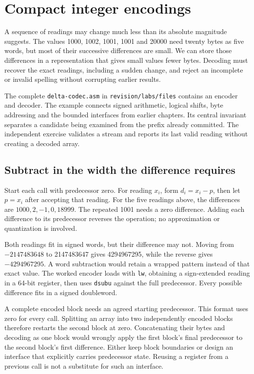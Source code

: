 \chapter{Compact integer encodings}
\label{revision:encodings}

A sequence of readings may change much less than its absolute magnitude suggests.
The values 1000, 1002, 1001, 1001 and 20000 need twenty bytes as five words, but
most of their successive differences are small. We can store those differences
in a representation that gives small values fewer bytes. Decoding must recover
the exact readings, including a sudden change, and reject an incomplete or
invalid spelling without corrupting earlier results.

The complete \texttt{delta-codec.asm} in \texttt{revision/labs/files} contains
an encoder and decoder. The example connects signed arithmetic, logical shifts,
byte addressing and the bounded interfaces from earlier chapters. Its central
invariant separates a candidate being examined from the prefix already committed.
The independent exercise validates a stream and reports its last valid reading
without creating a decoded array.

\section{Subtract in the width the difference requires}

Start each call with predecessor zero. For reading $x_i$, form
$d_i=x_i-p$, then let $p=x_i$ after accepting that reading. For the five readings
above, the differences are $1000,2,-1,0,18999$. The repeated 1001 needs a zero
difference. Adding each difference to its predecessor reverses the operation;
no approximation or quantization is involved.

Both readings fit in signed words, but their difference may not. Moving from
$-2147483648$ to 2147483647 gives 4294967295, while the reverse gives
$-4294967295$. A word subtraction would retain a wrapped pattern instead of
that exact value. The worked encoder loads with \texttt{lw}, obtaining a
sign-extended reading in a 64-bit register, then uses \texttt{dsubu} against
the full predecessor. Every possible difference fits in a signed doubleword.

A complete encoded block needs an agreed starting predecessor. This format uses
zero for every call. Splitting an array into two independently encoded blocks
therefore restarts the second block at zero. Concatenating their bytes and
decoding as one block would wrongly apply the first block's final predecessor
to the second block's first difference. Either keep block boundaries or design
an interface that explicitly carries predecessor state. Reusing a register from
a previous call is not a substitute for such an interface.

